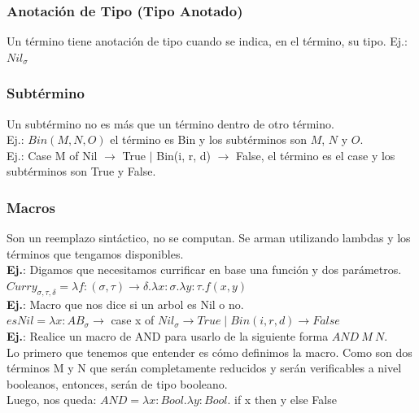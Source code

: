 \documentclass[10pt,a4paper]{article}
\begin{document}
\subsubsection*{Anotación de Tipo (Tipo Anotado)}
Un término tiene anotación de tipo cuando se indica, en el término, su tipo. Ej.: $Nil_{\sigma}$
\subsubsection*{Subtérmino}
Un subtérmino no es más que un término dentro de otro término. \\
Ej.: $Bin(M, N, O)$ el término es Bin y los subtérminos son $M$, $N$ y $O$. \\
Ej.: Case M of Nil $\rightarrow$ True $\mid$ Bin(i, r, d) $\rightarrow$ False, el término es el case y los subtérminos son True y False.
\subsubsection*{Macros}
Son un reemplazo sintáctico, no se computan. Se arman utilizando lambdas y los términos que tengamos disponibles. \\
\textbf{Ej.}: Digamos que necesitamos currificar en base una función y dos parámetros. \\
$Curry_{\sigma, \tau, \delta} = \lambda f:(\sigma, \tau) \rightarrow \delta . \lambda x:\sigma .\lambda y:\tau . f(x,y)$ \\

\textbf{Ej.}: Macro que nos dice si un arbol es Nil o no. \\
$esNil = \lambda x: AB_{\sigma} \rightarrow$ case x of $Nil_{\sigma} \rightarrow True \mid Bin(i, r, d) \rightarrow False$ \\

\textbf{Ej.}: Realice un macro de AND para usarlo de la siguiente forma $AND \ M \ N$. \\
Lo primero que tenemos que entender es cómo definimos la macro. Como son dos términos M y N que serán completamente reducidos y serán verificables a nivel booleanos, entonces, serán de tipo booleano. \\
Luego, nos queda: $AND = \lambda x: Bool . \lambda y: Bool$. if x then y else False
\end{document}

